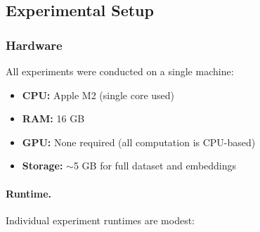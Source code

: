
\subsection{Experimental Setup}
\label{app:experimental_setup}

\subsubsection{Hardware}

All experiments were conducted on a single machine:

\begin{itemize}[leftmargin=*,noitemsep]
    \item \textbf{CPU:} Apple M2 (single core used)
    \item \textbf{RAM:} 16 GB
    \item \textbf{GPU:} None required (all computation is CPU-based)
    \item \textbf{Storage:} $\sim$5 GB for full dataset and embeddings
\end{itemize}

\paragraph{Runtime.}
Individual experiment runtimes are modest:

